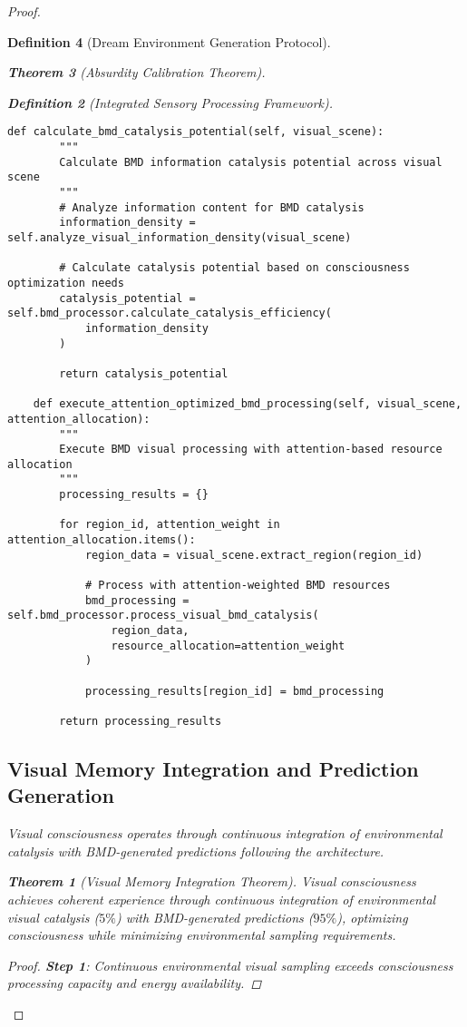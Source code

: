 \documentclass[12pt,a4paper]{article}
\newtheorem{theorem}{Theorem}[section]
\newtheorem{definition}[theorem]{Definition}
\begin{document}
\begin{proof}
\begin{definition}[Dream Environment Generation Protocol]
\begin{theorem}[Absurdity Calibration Theorem]
\begin{observation}
\begin{definition}[Integrated Sensory Processing Framework]
\begin{lstlisting}[style=pythonstyle, caption=Visual Attention BMD Resource Allocation]
    def calculate_bmd_catalysis_potential(self, visual_scene):
        """
        Calculate BMD information catalysis potential across visual scene
        """
        # Analyze information content for BMD catalysis
        information_density = self.analyze_visual_information_density(visual_scene)
        
        # Calculate catalysis potential based on consciousness optimization needs
        catalysis_potential = self.bmd_processor.calculate_catalysis_efficiency(
            information_density
        )
        
        return catalysis_potential
    
    def execute_attention_optimized_bmd_processing(self, visual_scene, attention_allocation):
        """
        Execute BMD visual processing with attention-based resource allocation
        """
        processing_results = {}
        
        for region_id, attention_weight in attention_allocation.items():
            region_data = visual_scene.extract_region(region_id)
            
            # Process with attention-weighted BMD resources
            bmd_processing = self.bmd_processor.process_visual_bmd_catalysis(
                region_data,
                resource_allocation=attention_weight
            )
            
            processing_results[region_id] = bmd_processing
        
        return processing_results
\end{lstlisting}

\subsection{Visual Memory Integration and Prediction Generation}

Visual consciousness operates through continuous integration of environmental catalysis with BMD-generated predictions following the  architecture.

\begin{theorem}[Visual Memory Integration Theorem]
Visual consciousness achieves coherent experience through continuous integration of environmental visual catalysis ($5\%$) with BMD-generated predictions ($95\%$), optimizing consciousness while minimizing environmental sampling requirements.
\end{theorem}

\begin{proof}
\textbf{Step 1}: Continuous environmental visual sampling exceeds consciousness processing capacity and energy availability.


\end{proof}
\end{definition}
\end{observation}
\end{theorem}
\end{definition}
\end{proof}
\end{document}
